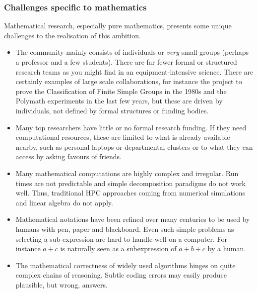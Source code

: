 \subsubsection{Challenges specific to  mathematics}

Mathematical research, especially pure mathematics, presents some
unique challenges to the realisation of this ambition.


\begin{itemize}
\item The community mainly consists of individuals or \textit{very} small
  groups (perhaps a professor and a few students). There are far fewer formal or structured research
  teams as you might find in an equipment-intensive science. There are
  certainly examples of large scale collaborations, for instance the
  project to prove the Classification of Finite Simple Groups in the
  1980s and the Polymath experiments in the last few years,
  but these are driven by individuals, not defined by formal
  structures or funding bodies.
\item Many top researchers have little or no formal research
  funding. If they need computational resources, these are limited to what 
  is already available nearby, such as personal laptops or
  departmental clusters or to what they can access by asking favours
  of friends.
\item Many mathematical computations are highly complex and irregular.
  Run times are not predictable and simple decomposition paradigms do
  not work well. Thus,
  traditional HPC approaches coming from numerical simulations and linear algebra do not apply.
\item Mathematical notations have been refined over many centuries to be
  used by humans with pen, paper and blackboard. Even such simple
  problems as selecting a sub-expression are hard to handle well on a
  computer. For instance $a+c$ is naturally seen as a subexpression of
  $a+b+c$ by a human.
\item The mathematical correctness of widely used algorithms hinges on
  quite complex chains of reasoning. Subtle coding errors may easily
  produce plausible, but wrong, answers.


\end{itemize}
